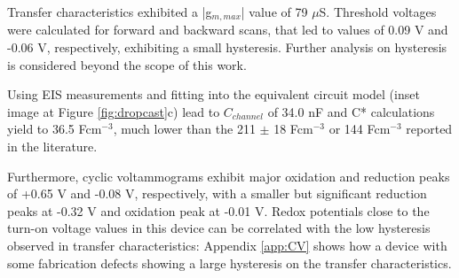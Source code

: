 Transfer characteristics exhibited a |g$_{m,max}$| value of 79 $\mu$S. Threshold voltages were calculated for forward and backward scans, that led to values of 0.09 V and -0.06 V, respectively, exhibiting a small hysteresis. Further analysis on hysteresis is considered beyond the scope of this work. 

Using EIS measurements and fitting into the equivalent circuit model (inset image at Figure \ref{fig:dropcast}c) lead to $C_{channel}$ of 34.0 nF and C* calculations yield to 36.5 Fcm$^{-3}$, much lower than the 211 $\pm$ 18 Fcm$^{-3}$ \cite{moserEthyleneGlycolBasedSide2020} or 144 Fcm$^{-3}$ \cite{hidalgocastilloSimultaneousPerformanceStability2022a} reported in the literature. 

Furthermore, cyclic voltammograms exhibit major oxidation and reduction peaks of +0.65 V and -0.08 V, respectively, with a smaller but significant reduction peaks at -0.32 V and oxidation peak at -0.01 V. Redox potentials close to the turn-on voltage values in this device can be correlated with the low hysteresis observed in transfer characteristics: Appendix \ref{app:CV} shows how a device with some fabrication defects showing a large hysteresis on the transfer characteristics. 

